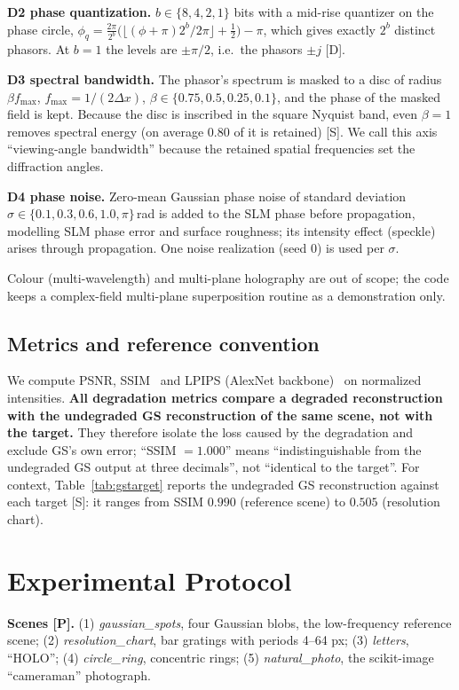 \documentclass[conference]{IEEEtran}
\begin{document}
\textbf{D2 phase quantization.} $b\in\{8,4,2,1\}$ bits with a mid-rise
quantizer on the phase circle,
$\phi_q=\frac{2\pi}{2^b}\big(\lfloor(\phi+\pi)2^b/2\pi\rfloor+\tfrac12\big)-\pi$,
which gives exactly $2^b$ distinct phasors. At $b=1$ the levels are
$\pm\pi/2$, i.e.\ the phasors $\pm j$ [D].

\textbf{D3 spectral bandwidth.} The phasor's spectrum is masked to a disc of
radius $\beta f_{\max}$, $f_{\max}=1/(2\Delta x)$,
$\beta\in\{0.75,0.5,0.25,0.1\}$, and the phase of the masked field is kept.
Because the disc is inscribed in the square Nyquist band, even $\beta=1$
removes spectral energy (on average $0.80$ of it is retained) [S]. We call
this axis ``viewing-angle bandwidth'' because the retained spatial
frequencies set the diffraction angles.

\textbf{D4 phase noise.} Zero-mean Gaussian phase noise of standard deviation
$\sigma\in\{0.1,0.3,0.6,1.0,\pi\}$\,rad is added to the SLM phase before
propagation, modelling SLM phase error and surface roughness; its intensity
effect (speckle) arises through propagation. One noise realization
(seed 0) is used per $\sigma$.

Colour (multi-wavelength) and multi-plane holography are out of scope; the
code keeps a complex-field multi-plane superposition routine as a
demonstration only.

\subsection{Metrics and reference convention}
We compute PSNR, SSIM~\cite{wang2004image} and LPIPS (AlexNet
backbone)~\cite{zhang2018unreasonable} on normalized intensities.
\textbf{All degradation metrics compare a degraded reconstruction with the
undegraded GS reconstruction of the same scene, not with the target.} They
therefore isolate the loss caused by the degradation and exclude GS's own
error; ``SSIM $=1.000$'' means ``indistinguishable from the undegraded GS
output at three decimals'', not ``identical to the target''. For context,
Table~\ref{tab:gstarget} reports the undegraded GS reconstruction against each
target [S]: it ranges from SSIM $0.990$ (reference scene) to $0.505$
(resolution chart).

\section{Experimental Protocol}
\label{sec:experiments}
\textbf{Scenes [P].} (1) \textit{gaussian\_spots}, four Gaussian blobs, the
low-frequency reference scene; (2) \textit{resolution\_chart}, bar gratings
with periods 4--64 px; (3) \textit{letters}, ``HOLO''; (4)
\textit{circle\_ring}, concentric rings; (5) \textit{natural\_photo}, the
scikit-image ``cameraman'' photograph.
\end{document}
